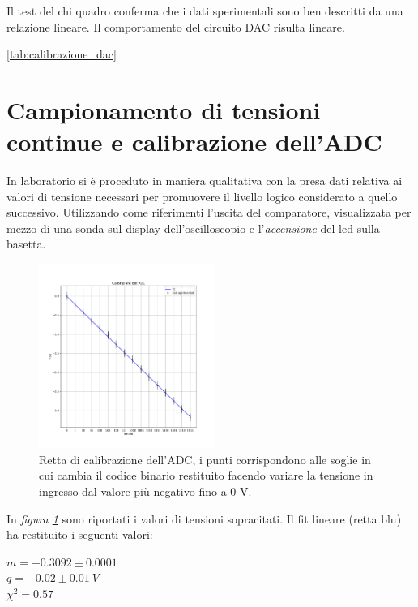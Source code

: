 \documentclass[journal]{IEEEtran}
\begin{document}
Il test del chi quadro conferma che i dati sperimentali sono ben descritti da una relazione lineare. Il comportamento del circuito DAC risulta lineare.

\ref{tab:calibrazione_dac}


\section{Campionamento di tensioni continue e calibrazione dell'ADC}
In laboratorio si è proceduto in maniera qualitativa con la presa dati relativa ai valori di tensione necessari per promuovere il livello logico considerato a quello successivo. Utilizzando come riferimenti l'uscita del comparatore, visualizzata per mezzo di una sonda sul display dell'oscilloscopio e l'\textit{accensione} del led sulla basetta. %

\begin{figure}[H]%
\centering
\begin{center}
\includegraphics[width=0.51\textwidth]{analysis/output/calibrazione_adc.pdf}
\end{center}
\caption{Retta di calibrazione dell'ADC, i punti corrispondono alle soglie in cui cambia il codice binario restituito facendo variare la tensione in ingresso dal valore più negativo fino a 0 V.}
\label{fig:graph_calibrazione_adc}
\end{figure}

In \textit{figura \ref{fig:graph_calibrazione_adc}} sono riportati i valori di tensioni sopracitati.
Il fit lineare (retta blu) ha restituito i seguenti valori:
\newline

$ m = -0.3092 \pm 0.0001 $ \\
$ q = -0.02 \pm 0.01 \ V$ \\
$ \chi^{2} = 0.57 $ \\
\end{document}
